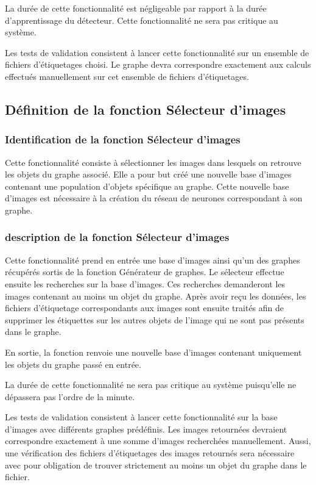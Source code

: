 \documentclass[debug,nodate,hideweeklyreports,noposter]{polytech/polytech}
\begin{document}
La durée de cette fonctionnalité est négligeable par rapport à la durée d'apprentissage du détecteur. Cette fonctionnalité ne sera pas critique au système.

Les tests de validation consistent à lancer cette fonctionnalité sur un ensemble de fichiers d'étiquetages choisi. Le graphe devra correspondre exactement aux calculs effectués manuellement sur cet ensemble de fichiers d'étiquetages.

\subsection{Définition de la fonction Sélecteur d’images}

\subsubsection{Identification de la fonction Sélecteur d’images}

Cette fonctionnalité consiste à sélectionner les images dans lesquels on retrouve les objets du graphe associé. Elle a pour but créé une nouvelle base d’images contenant une population d’objets spécifique au graphe. Cette nouvelle base d’images est nécessaire à la création du réseau de neurones correspondant à son graphe.

\subsubsection{description de la fonction Sélecteur d’images}

Cette fonctionnalité prend en entrée une base d’images ainsi qu’un des graphes récupérés sortis de la fonction Générateur de graphes.
Le sélecteur effectue ensuite les recherches sur la base d’images. Ces recherches demanderont les images contenant au moins un objet du graphe.
Après avoir reçu les données, les fichiers d’étiquetage correspondants aux images sont ensuite traités afin de supprimer les étiquettes sur les autres objets de l’image qui ne sont pas présents dans le graphe.

En sortie, la fonction renvoie une nouvelle base d’images contenant uniquement les objets du graphe passé en entrée.

La durée de cette fonctionnalité ne sera pas critique au système puisqu'elle ne dépassera pas l'ordre de la minute.

Les tests de validation consistent à lancer cette fonctionnalité sur la base d'images  avec différents graphes prédéfinis. Les images retournées devraient correspondre exactement à une somme d'images recherchées manuellement. Aussi, une vérification des fichiers d'étiquetages des images retournés sera nécessaire avec pour obligation de trouver strictement au moins un objet du graphe dans le fichier. 
\end{document}
